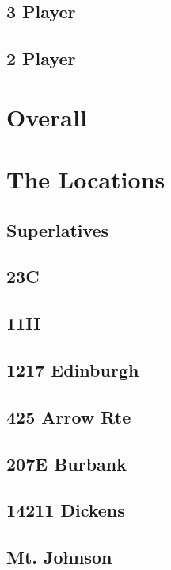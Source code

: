     \section{3 Player}
    
    \section{2 Player}
  
  \chapter{Overall}
  
  \chapter{The Locations}
    \section{Superlatives}
    \section{23C}
    \section{11H}
    \section{1217 Edinburgh}
    \section{425 Arrow Rte}
    \section{207E Burbank} 
    \section{14211 Dickens}
    \section{Mt. Johnson}
    
